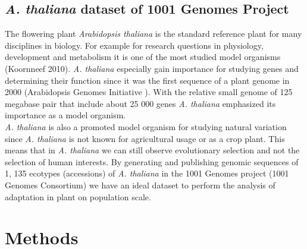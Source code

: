 \section{\textit{A. thaliana} dataset of 1001 Genomes Project}
The flowering plant \textit{Arabidopsis thaliana} is the standard reference plant for many disciplines in biology. For example for research questions in physiology, development and metabolism it is one of the most studied model organisms (Koornneef 2010\cite{Koornneef2010}). \textit{A. thaliana} especially gain importance for studying genes and determining their function since it was the first sequence of a plant genome in 2000 (Arabidopsis Genomes Initiative \cite{AGI2000}). With the relative small genome of 125 megabase pair that include about 25 000 genes \textit{A. thaliana} emphasized its importance as a model organism.\\
\textit{A. thaliana} is also a promoted model organism for studying natural variation since \textit{A. thaliana} is not known for agricultural usage or as a crop plant. This means that in \textit{A. thaliana} we can still observe evolutionary selection and not the selection of human interests\cite{Koornneef2010}. By generating and publishing genomic sequences of 1, 135 ecotypes (accessions) of \textit{A. thaliana} in the 1001 Genomes project (1001 Genomes Consortium\cite{1001Genomes2016})  we have an ideal dataset to perform the analysis of adaptation in plant on population scale.
\chapter{Methods}